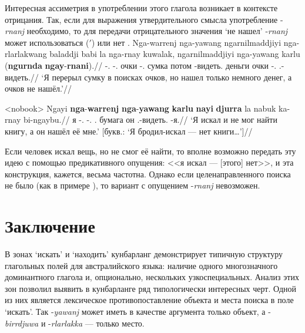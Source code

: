 Интересная ассиметрия в употреблении этого глагола возникает в контексте отрицания. Так, если для выражения утвердительного смысла употребление -\textit{rnanj} необходимо, то для передачи отрицательного значения `не нашел' -\textit{rnanj} может использоваться ($'$) или нет .
\ex[exno={\getref{bag}$'$}]\begingl
\gla Nga-warrenj nga-yawang ngarnilmaddjiyi nga-rlarlakwang baladdji babi la nga-rnay kuwalak, ngarnilmaddjiyi nga-yawang karlu (\textbf{ngurnda} \textbf{ngay}-\textbf{rnani}).//
\glb \nga-\warre.\Pst{} \nga-\yaw.\Pst{} очки \nga-\rlk.\Pst{} сумка потом \la{} \nga-видеть.\Pst{} деньги очки \nga-\yaw.\Pst{} \karlu{} \phantom{(}\Neg{} \Fsg.\irrpst-видеть.\irrpst{}//
\glft `Я перерыл сумку в поисках очков, но нашел только немного денег, а очков не нашёл.'//%
\endgl\xe

\ex<nobook>\begingl
\gla Ngayi \textbf{nga}-\textbf{warrenj} \textbf{nga}-\textbf{yawang} \textbf{karlu} \textbf{nayi} \textbf{djurra} la nabuk ka-rnay bi-ngaybu.//
\glb я \nga-\warre.\Pst{} \nga-\yaw.\Pst{} \karlu{} \Nm.\Cli{} бумага \la{} он \Tsg.\Real-видеть.\Pst{} \bi-я.\Gen{}//
\glft `Я искал и не мог найти книгу, а он нашёл её мне.' [букв.: `Я бродил-искал --- нет книги\ldots']//%
\endgl\xe

Если человек искал вещь, но не смог её найти, то вполне возможно передать эту идею с помощью предикативного опущения: <<я искал --- [этого] нет>>, и эта конструкция, кажется, весьма частотна. Однако если целенаправленного поиска не было (как в примере ), то вариант с опущением -\textit{rnanj} невозможен.


\section{Заключение}
\label{sec:outro}
В зонах `искать' и `находить' кунбарланг демонстрирует типичную структуру глагольных полей для австралийского языка: наличие одного многозначного доминантного глагола и, опционально, нескольких узкоспециальных. Анализ этих зон позволил выявить в кунбарланге ряд типологически интересных черт. Одной из них является лексическое противопоставление объекта и места поиска в поле `искать'. Так -\textit{yawanj} может иметь в качестве аргумента только объект, а -\textit{birrdjuwa} и -\textit{rlarlakka} --- только место. 

